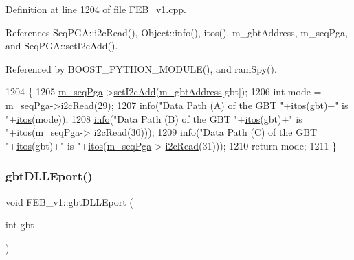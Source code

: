 Definition at line 1204 of file F\+E\+B\+\_\+v1.\+cpp.



References Seq\+P\+G\+A\+::i2c\+Read(), Object\+::info(), itos(), m\+\_\+gbt\+Address, m\+\_\+seq\+Pga, and Seq\+P\+G\+A\+::set\+I2c\+Add().



Referenced by B\+O\+O\+S\+T\+\_\+\+P\+Y\+T\+H\+O\+N\+\_\+\+M\+O\+D\+U\+L\+E(), and ram\+Spy().


\begin{DoxyCode}
1204                                 \{
1205   \hyperlink{classFEB__v1_a6c7804ac86796f233a8393043adf2e77}{m\_seqPga}->\hyperlink{classSeqPGA_a4ef334e4d2cb417b49033dce951728cd}{setI2cAdd}(\hyperlink{classFEB__v1_ac625855df976f16694178f1a4c0eef1e}{m\_gbtAddress}[gbt]);
1206   \textcolor{keywordtype}{int} mode = \hyperlink{classFEB__v1_a6c7804ac86796f233a8393043adf2e77}{m\_seqPga}->\hyperlink{classSeqPGA_a7cd344df2be99f3a02b487f80e87b27e}{i2cRead}(29);
1207   \hyperlink{classObject_a644fd329ea4cb85f54fa6846484b84a8}{info}(\textcolor{stringliteral}{"Data Path (A) of the GBT "}+\hyperlink{Tools_8h_af330027dbdafb9a30768b3613c553e60}{itos}(gbt)+\textcolor{stringliteral}{" is "}+\hyperlink{Tools_8h_af330027dbdafb9a30768b3613c553e60}{itos}(mode));
1208   \hyperlink{classObject_a644fd329ea4cb85f54fa6846484b84a8}{info}(\textcolor{stringliteral}{"Data Path (B) of the GBT "}+\hyperlink{Tools_8h_af330027dbdafb9a30768b3613c553e60}{itos}(gbt)+\textcolor{stringliteral}{" is "}+\hyperlink{Tools_8h_af330027dbdafb9a30768b3613c553e60}{itos}(\hyperlink{classFEB__v1_a6c7804ac86796f233a8393043adf2e77}{m\_seqPga}->
      \hyperlink{classSeqPGA_a7cd344df2be99f3a02b487f80e87b27e}{i2cRead}(30)));
1209   \hyperlink{classObject_a644fd329ea4cb85f54fa6846484b84a8}{info}(\textcolor{stringliteral}{"Data Path (C) of the GBT "}+\hyperlink{Tools_8h_af330027dbdafb9a30768b3613c553e60}{itos}(gbt)+\textcolor{stringliteral}{" is "}+\hyperlink{Tools_8h_af330027dbdafb9a30768b3613c553e60}{itos}(\hyperlink{classFEB__v1_a6c7804ac86796f233a8393043adf2e77}{m\_seqPga}->
      \hyperlink{classSeqPGA_a7cd344df2be99f3a02b487f80e87b27e}{i2cRead}(31)));
1210   \textcolor{keywordflow}{return} mode; 
1211 \}
\end{DoxyCode}
\mbox{\label{classFEB__v1_add5e12a5351c0c4986d24f433155351b}} 
\subsubsection{\texorpdfstring{gbt\+D\+L\+L\+Eport()}{gbtDLLEport()}}
{\footnotesize\ttfamily void F\+E\+B\+\_\+v1\+::gbt\+D\+L\+L\+Eport (\begin{DoxyParamCaption}\item[{int}]{gbt }\end{DoxyParamCaption})}




